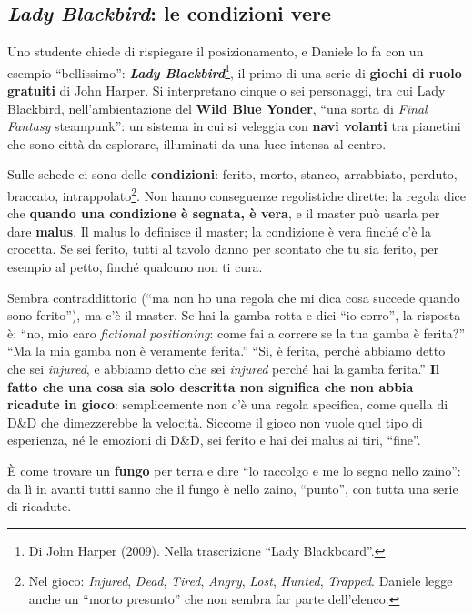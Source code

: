 \subsection{\emph{Lady Blackbird}: le condizioni vere}

Uno studente chiede di rispiegare il posizionamento, e Daniele lo fa con un esempio ``bellissimo'':
\textbf{\emph{Lady Blackbird}}\footnote{Di John Harper (2009). Nella trascrizione ``Lady
Blackboard''.}, il primo di una serie di \textbf{giochi di ruolo gratuiti} di John Harper. Si
interpretano cinque o sei personaggi, tra cui Lady Blackbird, nell'ambientazione del \textbf{Wild
Blue Yonder}, ``una sorta di \emph{Final Fantasy} steampunk'': un sistema in cui si veleggia con
\textbf{navi volanti} tra pianetini che sono città da esplorare, illuminati da una luce intensa al
centro.

Sulle schede ci sono delle \textbf{condizioni}: ferito, morto, stanco, arrabbiato, perduto,
braccato, intrappolato\footnote{Nel gioco: \emph{Injured}, \emph{Dead}, \emph{Tired},
\emph{Angry}, \emph{Lost}, \emph{Hunted}, \emph{Trapped}. Daniele legge anche un ``morto presunto''
che non sembra far parte dell'elenco.}. Non hanno conseguenze regolistiche dirette: la regola dice
che \textbf{quando una condizione è segnata, è vera}, e il master può usarla per dare
\textbf{malus}. Il malus lo definisce il master; la condizione è vera finché c'è la crocetta. Se sei
ferito, tutti al tavolo danno per scontato che tu sia ferito, per esempio al petto, finché qualcuno
non ti cura.

Sembra contraddittorio (``ma non ho una regola che mi dica cosa succede quando sono ferito''), ma
c'è il master. Se hai la gamba rotta e dici ``io corro'', la risposta è: ``no, mio caro
\emph{fictional positioning}: come fai a correre se la tua gamba è ferita?'' ``Ma la mia gamba non
è veramente ferita.'' ``Sì, è ferita, perché abbiamo detto che sei \emph{injured}, e abbiamo
detto che sei \emph{injured} perché hai la gamba ferita.'' \textbf{Il fatto che una cosa sia solo
descritta non significa che non abbia ricadute in gioco}: semplicemente non c'è una regola
specifica, come quella di D\&D che dimezzerebbe la velocità. Siccome il gioco non vuole quel tipo
di esperienza, né le emozioni di D\&D, sei ferito e hai dei malus ai tiri, ``fine''.

È come trovare un \textbf{fungo} per terra e dire ``lo raccolgo e me lo segno nello zaino'': da lì
in avanti tutti sanno che il fungo è nello zaino, ``punto'', con tutta una serie di ricadute.

